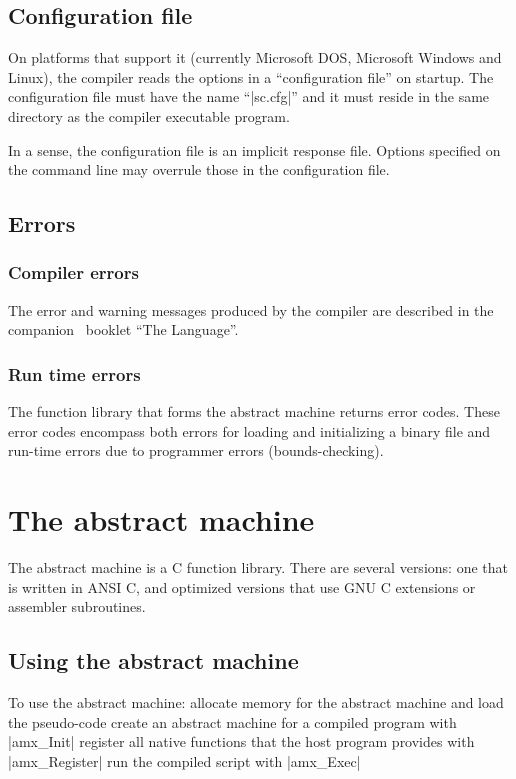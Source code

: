 \section{Configuration file}
 
On platforms that support it (currently Microsoft DOS, Microsoft Windows and Linux),
the compiler reads the options in a ``configuration file'' on startup. The
configuration file must have the name ``|sc.cfg|'' and it must reside in the
same directory as the compiler executable program.

In a sense, the configuration file is an implicit response file. Options
specified on the command line may overrule those in the configuration file.


\section{Errors}
\subsection{Compiler errors}
The error and warning messages produced by the compiler are described in
the companion \Small\ booklet ``The Language''.

\subsection{Run time errors}
The function library that forms the abstract machine returns error codes.
%
These error codes encompass both errors for loading and initializing a
binary file and run-time errors due to programmer errors (bounds-checking).


\chapter{The abstract machine}
The abstract machine is a C function library. There are several versions: one
that is written in ANSI C, and optimized versions that use GNU C extensions or
assembler subroutines.

\section{Using the abstract machine}
To use the abstract machine:
\beginlist{1em} \compactlist
\list{\lbullet} allocate memory for the abstract machine and load the pseudo-code
\list{\lbullet} create an abstract machine for a compiled program with
  |amx_Init|
\list{\lbullet} register all native functions that the host program provides
  with |amx_Register|
\list{\lbullet} run the compiled script with |amx_Exec|
\endlist

